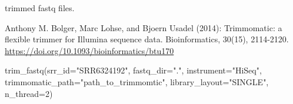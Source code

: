 \documentclass[letterpaper]{book}
\begin{document}
%
\begin{Value}
trimmed fastq files.
\end{Value}
%
\begin{References}\relax
Anthony M. Bolger, Marc Lohse, and Bjoern Usadel (2014):
Trimmomatic: a flexible trimmer for Illumina sequence data. Bioinformatics, 30(15), 2114-2120.
\url{https://doi.org/10.1093/bioinformatics/btu170}
\end{References}
%
\begin{Examples}
\begin{ExampleCode}

trim_fastq(srr_id="SRR6324192", fastq_dir=".", instrument="HiSeq", 
trimmomatic_path="path_to_trimmomtic", library_layout="SINGLE", n_thread=2)

\end{ExampleCode}
\end{Examples}
\printindex{}
\end{document}
